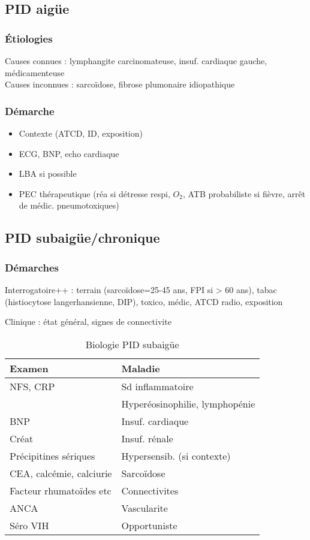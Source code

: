 \documentclass{book}
\begin{document}
\subsection{PID aigüe}
\label{sec:org2eb2e5a}
\subsubsection{Étiologies}
\label{sec:org39773f4}
Causes connues : lymphangite carcinomateuse, insuf. cardiaque gauche, médicamenteuse\\
Causes inconnues : sarcoïdose, fibrose plumonaire idiopathique
\subsubsection{Démarche}
\label{sec:orgb3b27af}

\begin{itemize}
\item Contexte (ATCD, ID, exposition)
\item ECG, BNP, echo cardiaque
\item LBA si possible
\item PEC thérapeutique (réa si détresse respi, \(O_2\), ATB probabiliste si fièvre, arrêt de médic. pneumotoxiques)
\end{itemize}


\subsection{PID subaigüe/chronique}
\label{sec:org0c0a3f7}
\subsubsection{Démarches}
\label{sec:org40e3519}
Interrogatoire++ : terrain (sarcoïdose=25-45 ans, \gls{FPI} si > 60 ans), tabac (histiocytose langerhansienne, \gls{DIP}), toxico, médic, ATCD radio, exposition

Clinique : état général, signes de connectivite

\begin{table}[htbp]
  \caption{Biologie PID subaigüe}
  \centering
  \begin{tabular}{ll}
    \toprule
    Examen & Maladie\\
    \midrule
    NFS, CRP & Sd inflammatoire\\
           & Hyperéosinophilie, lymphopénie\\
    BNP & Insuf. cardiaque\\
    Créat & Insuf. rénale\\
    Précipitines sériques & Hypersensib. (si contexte)\\
    CEA, calcémie, calciurie & Sarcoïdose\\
    Facteur rhumatoïdes etc & Connectivites\\
    ANCA & Vascularite\\
    Séro VIH & Opportuniste\\
    \bottomrule
  \end{tabular}
\end{table}
\end{document}
